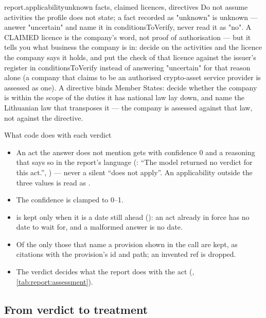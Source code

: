 \begin{promptexcerpt}{report.applicability}{unknown facts, claimed licences, directives}
  Do not assume activities the profile does not state; a fact recorded as
  "unknown" is unknown — answer "uncertain" and name it in conditionsToVerify,
  never read it as "no". A CLAIMED licence is the company's word, not proof of
  authorisation — but it tells you what business the company is in: decide on
  the activities and the licence the company says it holds, and put the check of
  that licence against the issuer's register in conditionsToVerify instead of
  answering "uncertain" for that reason alone (a company that claims to be an
  authorised crypto-asset service provider is assessed as one). A directive binds
  Member States: decide whether the company is within the scope of the duties it has
  national law lay down, and name the Lithuanian law that transposes it — the company
  is assessed against that law, not against the directive.
\end{promptexcerpt}

\begin{codebox}{What code does with each verdict}
\begin{itemize}
  \item An act the answer does not mention gets  with confidence 0 and a
    reasoning that says so in the report's language (: \enquote{The model
    returned no verdict for this act.}, )
    --- never a silent \enquote{does not apply}. An applicability outside the three values is read as
    .
  \item The confidence is clamped to 0--1.
  \item {} is kept only when it is a date still ahead ():
    an act already in force has no date to wait for, and a malformed answer is no date.
  \item Of the  only those that name a provision shown in the call are
    kept, as citations with the provision's id and path; an invented ref is dropped.
  \item The verdict decides what the report does with the act (,
    \cref{tab:report:assessment}).
\end{itemize}
\end{codebox}

\subsection{From verdict to treatment}\label{sec:report:assessment}

